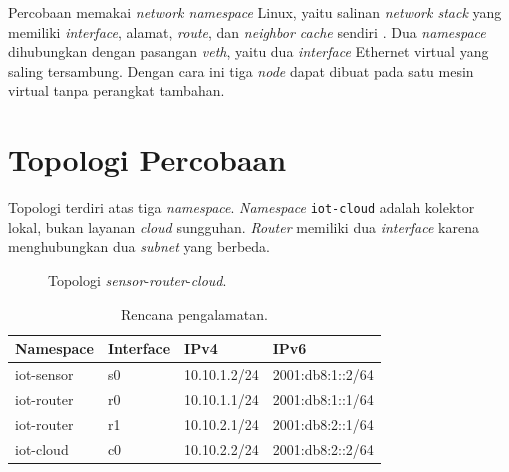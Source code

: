 \documentclass[12pt,a4paper]{report}
\newcommand{\hdr}[1]{\cellcolor{hijauhdr}\textbf{#1}}
\newcommand{\kode}[1]{\texttt{\small #1}}
\begin{document}
Percobaan memakai \emph{network namespace} Linux, yaitu salinan \emph{network stack} yang memiliki \emph{interface}, alamat, \emph{route}, dan \emph{neighbor cache} sendiri \cite{ipnetns}. Dua \emph{namespace} dihubungkan dengan pasangan \emph{veth}, yaitu dua \emph{interface} Ethernet virtual yang saling tersambung. Dengan cara ini tiga \emph{node} dapat dibuat pada satu mesin virtual tanpa perangkat tambahan.

\section{Topologi Percobaan}
Topologi terdiri atas tiga \emph{namespace}. \emph{Namespace} \kode{iot-cloud} adalah kolektor lokal, bukan layanan \emph{cloud} sungguhan. \emph{Router} memiliki dua \emph{interface} karena menghubungkan dua \emph{subnet} yang berbeda.

\begin{figure}[H]
\centering
{}
\caption{Topologi \emph{sensor}-\emph{router}-\emph{cloud}.}
\label{fig:topologi}
\end{figure}

\begin{table}[H]
\centering
\small
\begin{tabular}{|L{3cm}|L{2.2cm}|L{3.2cm}|L{4cm}|}
\hline
\hdr{Namespace} & \hdr{Interface} & \hdr{IPv4} & \hdr{IPv6} \\ \hline
iot-sensor & s0 & 10.10.1.2/24 & 2001:db8:1::2/64 \\ \hline
iot-router & r0 & 10.10.1.1/24 & 2001:db8:1::1/64 \\ \hline
iot-router & r1 & 10.10.2.1/24 & 2001:db8:2::1/64 \\ \hline
iot-cloud & c0 & 10.10.2.2/24 & 2001:db8:2::2/64 \\ \hline
\end{tabular}
\caption{Rencana pengalamatan.}
\label{tab:alamat}
\end{table}
\end{document}
